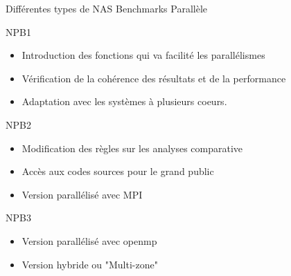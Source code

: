 \documentclass{beamer}
\begin{document}
\begin{frame}{Différentes types de NAS Benchmarks Parallèle}

  \begin{block}{NPB1}
    \begin{itemize}
    \item Introduction des fonctions qui va facilité les parallélismes
    \item Vérification de la cohérence des résultats et de la performance
    \item Adaptation avec les systèmes à plusieurs coeurs.
    \end{itemize}
  \end{block}
  
  \begin{block}{NPB2}
    \begin{itemize}
    \item Modification des règles sur les analyses comparative
    \item Accès aux codes sources pour le grand public
    \item Version parallélisé avec MPI
    \end{itemize}
  \end{block}
  
  \begin{block}{NPB3}
    \begin{itemize}
    \item Version parallélisé avec openmp
    \item Version hybride ou "Multi-zone" 
    \end{itemize}
  \end{block}

\end{frame}
\end{document}
